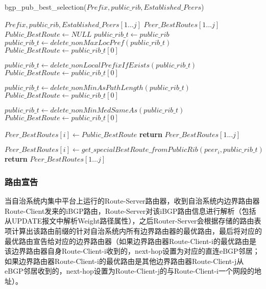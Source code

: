 \begin{algorithm}[!h]
    \caption{bgp\_pub\_best\_selection($Prefix, public\_rib, Established\_Peers$)}
    \label{alg:public_selection_one}
    \begin{algorithmic}[1]%
        \REQUIRE
        $Prefix, public\_rib, Established\_Peers[1...j]$
        \ENSURE
        $Peer\_BestRoutes[1...j]$
        \STATE $Public\_BestRoute \gets NULL$
        \STATE $public\_rib\_t \gets public\_rib$
        \STATE $public\_rib\_t \gets delete\_nonMaxLocPref(public\_rib\_t)$
        \STATE $Public\_BestRoute  \gets public\_rib\_t[0]$
        \ENDIF

        \STATE $public\_rib\_t \gets delete\_nonLocalPrefixIfExists(public\_rib\_t)$
        \STATE $Public\_BestRoute  \gets public\_rib\_t[0]$
        \ENDIF

        \STATE $public\_rib\_t \gets delete\_nonMinAsPathLength(public\_rib\_t)$
        \STATE $Public\_BestRoute  \gets public\_rib\_t[0]$
        \ENDIF

        \STATE $public\_rib\_t \gets delete\_nonMinMedSameAs(public\_rib\_t)$
        \STATE $Public\_BestRoute  \gets public\_rib\_t[0]$
        \ENDIF

        \STATE $Peer\_BestRoutes[i] \gets Public\_BestRoute $
        \ENDFOR
        \STATE \textbf{return} $Peer\_BestRoutes[1...j]$
        \ENDIF

        \STATE $Peer\_BestRoutes[i] \gets get\_specialBestRoute\_fromPublicRib(peer_i,public\_rib\_t)$
        \ENDFOR
        \STATE \textbf{return} $Peer\_BestRoutes[1...j]$
    \end{algorithmic}
\end{algorithm}





\subsubsection{路由宣告}
当自治系统内集中平台上运行的Route-Server路由器，收到自治系统内边界路由器Route-Client发来的iBGP路由，Route-Server对该iBGP路由信息进行解析（包括从UPDATE报文中解析Weight路径属性），之后Router-Server会根据存储的路由表项计算出该路由前缀的针对自治系统内所有边界路由器的最优路由，最后将对应的最优路由宣告给对应的边界路由器（如果边界路由器Route-Client-i的最优路由是该边界路由器自身Route-Client-i收到的，next-hop设置为对应的直连eBGP邻居；如果边界路由器Route-Client-i的最优路由是其他边界路由器Route-Client-j从eBGP邻居收到的，next-hop设置为Route-Client-j的与Route-Client-i一个网段的地址）。

